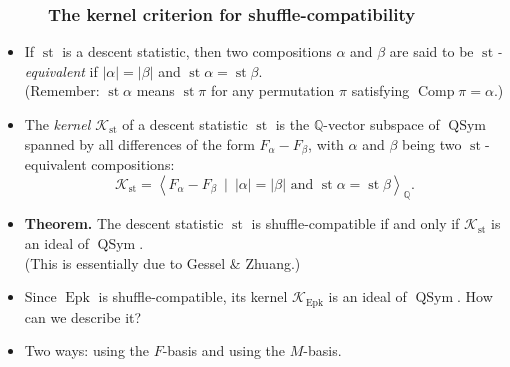 \documentclass{beamer}
\newcommand{\QQ}{{\mathbb Q}}
\newcommand{\Comp}{\operatorname{Comp}}
\newcommand{\Epk}{\operatorname{Epk}}
\newcommand{\st}{\operatorname{st}}
\newcommand{\QSym}{\operatorname{QSym}}
\newcommand{\calK}{\mathcal{K}}
\newcommand{\fti}[1]{\frametitle{\ \ \ \ \ #1}}
\newcommand{\abs}[1]{\left| #1 \right|}
\newcommand{\defn}[1]{{\color{darkred}\emph{#1}}} %
\theoremstyle{plain}
\begin{document}
\begin{frame}
\fti{The kernel criterion for shuffle-compatibility}

\begin{itemize}

\item If $\st$ is a descent statistic, then two compositions
      $\alpha$ and $\beta$ are said to be \defn{$\st$-equivalent}
      if $\abs{\alpha} = \abs{\beta}$ and $\st\alpha = \st\beta$.
      \\ (Remember: $\st\alpha$ means $\st\pi$ for any permutation
      $\pi$ satisfying $\Comp\pi = \alpha$.)

\pause

\item The \defn{kernel $\calK_{\st}$} of a descent statistic $\st$
      is the $\QQ$-vector subspace of $\QSym$ spanned by all
      differences of the form $F_\alpha - F_\beta$, with $\alpha$
      and $\beta$ being two $\st$-equivalent compositions:
      \[
      \calK_{\st} = \left< F_\alpha - F_\beta \ 
                              \mid \ \abs{\alpha} = \abs{\beta} \text{ and }
                                   \st \alpha = \st \beta \right>_\QQ .
      \]

\pause

\item \textbf{Theorem.} The descent statistic $\st$ is
      shuffle-compatible if and only if $\calK_{\st}$ is an
      ideal of $\QSym$. \\
      (This is essentially due to Gessel \& Zhuang.)

\pause
\item Since $\Epk$ is shuffle-compatible, its kernel $\calK_{\Epk}$
      is an ideal of $\QSym$.
      How can we describe it?

\item Two ways: using the $F$-basis and using the $M$-basis.

\end{itemize}

\end{frame}
\end{document}
